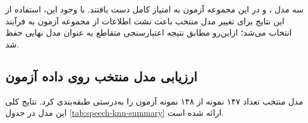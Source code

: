 \documentclass[12pt,a4paper,oneside]{report}
\begin{document}
\begin{table}[H]

\centering

\caption{مقایسه عملکرد مدل‌های طبقه‌بندی گفتار روی مجموعه آزمون}

\label{tab:speech-classification-results}


\end{table}

سه مدل ،  و  در
این مجموعه آزمون به امتیاز کامل دست یافتند. با وجود این، استفاده از این
نتایج برای تغییر مدل منتخب باعث نشت اطلاعات از مجموعه آزمون به فرآیند
انتخاب می‌شد؛ ازاین‌رو  مطابق نتیجه اعتبارسنجی متقاطع به عنوان مدل
نهایی حفظ شد.


\subsection{ارزیابی مدل منتخب روی داده آزمون}

مدل منتخب  تعداد ۱۴۷ نمونه از ۱۴۸ نمونه آزمون را
به‌درستی طبقه‌بندی کرد. نتایج کلی این مدل در جدول
\ref{tab:speech-knn-summary}
ارائه شده است.
\end{document}
